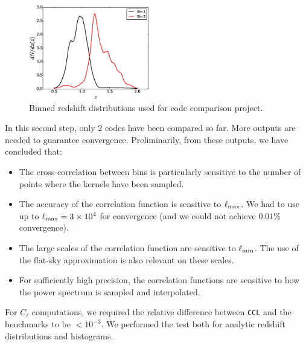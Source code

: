 \documentclass[\docopts]{\docclass}
\newcommand{\ccl}{{\tt CCL}\xspace}
\begin{document}
\begin{figure}
\centering
\includegraphics[width=0.47\textwidth]{zdist.eps}
\caption{Binned redshift distributions used for code comparison project.}
\label{fig:zhistos}
\end{figure}

In this second step, only 2 codes have been compared so far. More outputs are needed to guarantee convergence. Preliminarily, from these outputs, we have concluded that:
\begin{itemize}
\item The cross-correlation between bins is particularly sensitive to the number of points where the kernels have been sampled.
\item The accuracy of the correlation function is sensitive to $\ell_{\rm max}$. We had to use up to $\ell_{\rm max}=3\times10^4$ for convergence (and we could not achieve $0.01\%$ convergence).
\item The large scales of the correlation function are sensitive to $\ell_{\rm min}$. The use of the flat-sky approximation is also relevant on these scales.
\item For sufficiently high precision, the correlation functions are sensitive to how the power spectrum is sampled and interpolated.
\end{itemize}

For $C_\ell$ computations, we required the relative difference between \ccl and the benchmarks to be $<10^{-3}$. We performed the test both for analytic redshift distributions and histograms.
\end{document}
